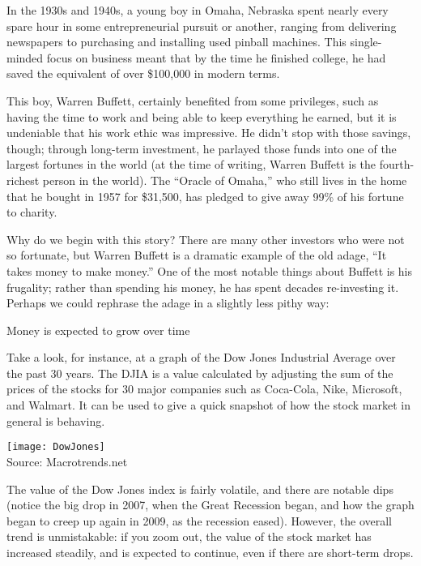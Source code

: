 \setcounter{ExampleCounter}{1}
In the 1930s and 1940s, a young boy in Omaha, Nebraska spent nearly every spare hour in some entrepreneurial pursuit or another, ranging from delivering newspapers to purchasing and installing used pinball machines.  This single-minded focus on business meant that by the time he finished college, he had saved the equivalent of over \$100,000 in modern terms.

This boy, Warren Buffett, certainly benefited from some privileges, such as having the time to work and being able to keep everything he earned, but it is undeniable that his work ethic was impressive.  He didn't stop with those savings, though; through long-term investment, he parlayed those funds into one of the largest fortunes in the world (at the time of writing, Warren Buffett is the fourth-richest person in the world).  The ``Oracle of Omaha,'' who still lives in the home that he bought in 1957 for \$31,500, has pledged to give away 99\% of his fortune to charity.

Why do we begin with this story?  There are many other investors who were not so fortunate, but Warren Buffett is a dramatic example of the old adage, ``It takes money to make money.''  One of the most notable things about Buffett is his frugality; rather than spending his money, he has spent decades re-investing it.  Perhaps we could rephrase the adage in a slightly less pithy way:
\begin{center}
Money is expected to grow over time
\end{center}

Take a look, for instance, at a graph of the Dow Jones Industrial Average over the past 30 years.  The DJIA is a value calculated by adjusting the sum of the prices of the stocks for 30 major companies such as Coca-Cola, Nike, Microsoft, and Walmart.  It can be used to give a quick snapshot of how the stock market in general is behaving.
\begin{center}
\texttt{[image: DowJones]}\\
\text{} \hfill {\color{gray} Source: Macrotrends.net}
\end{center}

The value of the Dow Jones index is fairly volatile, and there are notable dips (notice the big drop in 2007, when the Great Recession began, and how the graph began to creep up again in 2009, as the recession eased).  However, the overall trend is unmistakable: if you zoom out, the value of the stock market has increased steadily, and is expected to continue, even if there are short-term drops.

